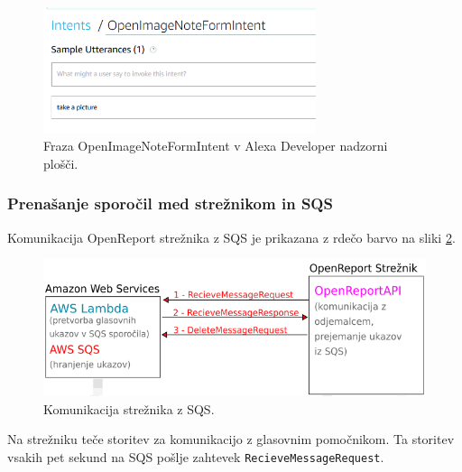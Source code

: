 \documentclass[a4paper, 12pt]{book}
\begin{document}
\begin{figure}[H]
\begin{center}
\includegraphics[width=8cm]{intent_image}
\end{center}
\caption{Fraza OpenImageNoteFormIntent v Alexa Developer nadzorni plošči.}
\label{OpenImageNoteFormIntent}
\end{figure}


\subsubsection{Prenašanje sporočil med strežnikom in SQS}

Komunikacija OpenReport strežnika z SQS je prikazana z rdečo barvo na sliki \ref{plan_sqs_server}.

\begin{figure}[H]
\begin{center}
\includegraphics[width=13cm]{plan_sqs_server}
\end{center}
\caption{Komunikacija strežnika z SQS.}
\label{plan_sqs_server}
\end{figure}


Na strežniku teče storitev za komunikacijo z glasovnim pomočnikom.
Ta storitev vsakih pet sekund na SQS pošlje zahtevek \texttt{RecieveMessageRequest}.
\end{document}
